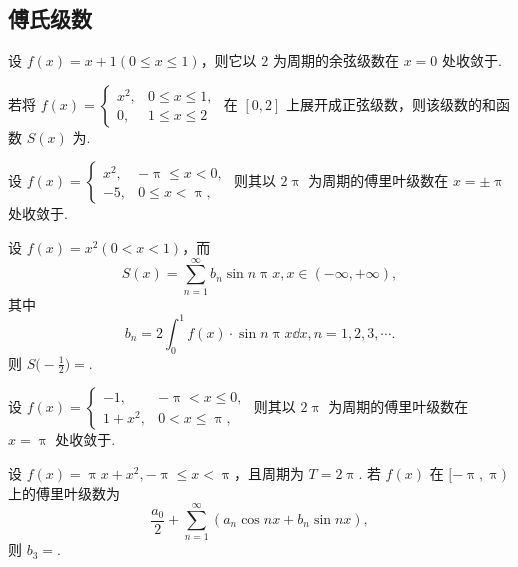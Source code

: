 \subsection{傅氏级数}

	\begin{ti}
		设 $f(x) = x + 1 (0 \leq x \leq 1)$，则它以 $2$ 为周期的余弦级数在 $x = 0$ 处收敛于\kuo.

	\end{ti}

	\begin{ti}
		若将 $f(x) = \begin{cases}
			x^{2}, & 0 \leq x \leq 1,\\
			0, & 1 \leq x \leq 2
		\end{cases}$ 在 $[0,2]$ 上展开成正弦级数，则该级数的和函数 $S(x)$ 为\htwo.
	\end{ti}

	\begin{ti}
		设 $f(x) = \begin{cases}
			x^{2}, & - \uppi \leq x < 0,\\
			-5, & 0 \leq x < \uppi,
		\end{cases}$ 则其以 $2 \uppi$ 为周期的傅里叶级数在 $x = \pm \uppi$ 处收敛于\htwo.
	\end{ti}

	\begin{ti}
		设 $f(x) = x^{2} (0 < x < 1)$，而
		\[
			S(x) = \sum_{n=1}^{\infty} b_{n} \sin n \uppi x, x \in (-\infty,+\infty),
		\]
		其中
		\[
			b_{n} = 2 \int_{0}^{1} f(x) \cdot \sin n \uppi x \dd{x}, n = 1,2,3,\cdots.
		\]
		则 $S\big( - \frac{1}{2} \bigr) = $\kuo.

		\fourch{$-\frac{1}{4}$}{$\frac{1}{4}$}{$-\frac{1}{2}$}{$\frac{1}{2}$}
	\end{ti}

	\begin{ti}
		设 $f(x) = \begin{cases}
			-1, & -\uppi < x \leq 0,\\
			1 + x^{2}, & 0 < x \leq \uppi,
		\end{cases}$ 则其以 $2\uppi$ 为周期的傅里叶级数在 $x = \uppi$ 处收敛于\htwo.
	\end{ti}

	\begin{ti}
		设 $f(x) = \uppi x + x^{2}, -\uppi \leq x < \uppi$，且周期为 $T = 2\uppi$. 若 $f(x)$ 在 $[-\uppi,\uppi)$ 上的傅里叶级数为
		\[
			\frac{a_{0}}{2} + \sum_{n=1}^{\infty} (a_{n} \cos nx + b_{n} \sin nx),
		\]
		则 $b_{3} = $\htwo.
	\end{ti}


